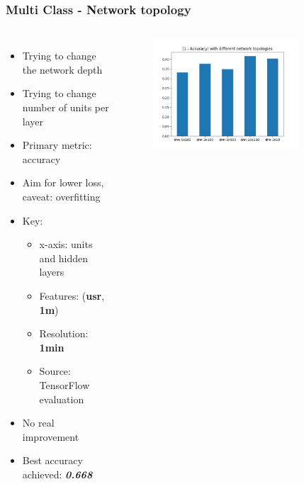 \documentclass[aspectratio=169,11pt,hyperref={colorlinks=true}]{beamer}
\begin{document}
\begin{frame}
    \frametitle{Multi Class - Network topology}
    \begin{columns}
        \begin{itemize}
            \item{Trying to change the network depth}
            \item{Trying to change number of units per layer}
            \item{Primary metric: accuracy}
            \item{Aim for lower loss, caveat: overfitting}
            \item{Key:}
            \begin{itemize}
              \item{x-axis: units and hidden layers}
              \item{Features: (\textbf{usr}, \textbf{1m})}
              \item{Resolution: \textbf{1min}}
              \item{Source: TensorFlow evaluation}
            \end{itemize}
            \item{No real improvement}
            \item{Best accuracy achieved: \emph{\textbf{0.668}}}
        \end{itemize}
        \begin{center}
        \begin{figure}
          \includegraphics[width=0.8\textwidth,height=0.4\textheight]{graphs/accuracy_by_topology-node_provider_all.png}
        \end{figure}
        \begin{figure}

\end{figure}
\end{center}
\end{columns}
\end{frame}
\end{document}
